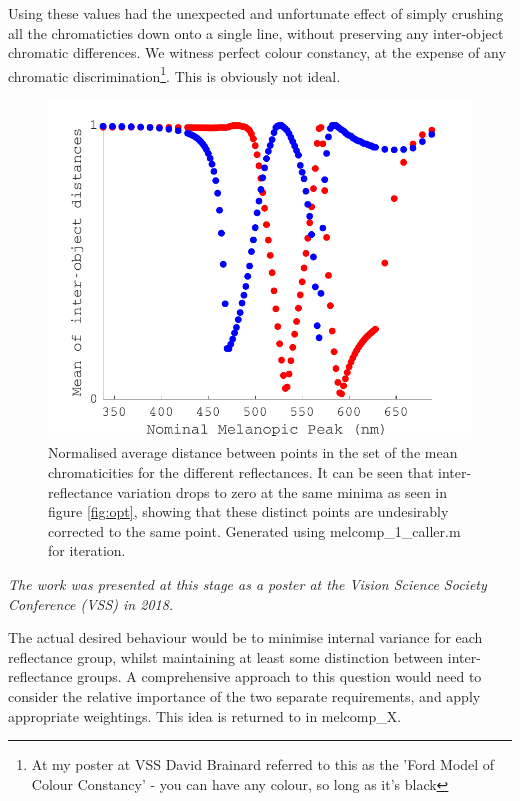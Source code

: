 Using these values had the unexpected and unfortunate effect of simply crushing all the chromaticties down onto a single line, without preserving any inter-object chromatic differences. We witness perfect colour constancy, at the expense of any chromatic discrimination\footnote{At my poster at VSS David Brainard referred to this as the 'Ford Model of Colour Constancy' - you can have any colour, so long as it's black}. This is obviously not ideal.

\begin{figure}[htbp]
    \includegraphics[max width=\textwidth]{figs/comp/melcomp_1_caller/sdmeans.pdf}
    \caption{Normalised average distance between points in the set of the mean chromaticities for the different reflectances. It can be seen that inter-reflectance variation drops to zero at the same minima as seen in figure \ref{fig:opt}, showing that these distinct points are undesirably corrected to the same point. Generated using melcomp\_1\_caller.m for iteration.}
    \label{fig:sdmeans}
\end{figure} 

\textit{The work was presented at this stage as a poster at the \emph{Vision Science Society Conference (VSS)} in 2018.}

The actual desired behaviour would be to minimise internal variance for each reflectance group, whilst maintaining at least some distinction between inter-reflectance groups. A comprehensive approach to this question would need to consider the relative importance of the two separate requirements, and apply appropriate weightings. This idea is returned to in melcomp\_X. %

